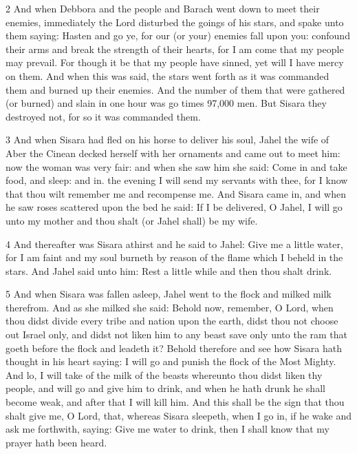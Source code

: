 \par 2 And when Debbora and the people and Barach went down to meet their enemies, immediately the Lord disturbed the goings of his stars, and spake unto them saying: Hasten and go ye, for our (or your) enemies fall upon you: confound their arms and break the strength of their hearts, for I am come that my people may prevail. For though it be that my people have sinned, yet will I have mercy on them. And when this was said, the stars went forth as it was commanded them and burned up their enemies. And the number of them that were gathered (or burned) and slain in one hour was go times 97,000 men. But Sisara they destroyed not, for so it was commanded them. 

\par 3 And when Sisara had fled on his horse to deliver his soul, Jahel the wife of Aber the Cinean decked herself with her ornaments and came out to meet him: now the woman was very fair: and when she saw him she said: Come in and take food, and sleep: and in. the evening I will send my servants with thee, for I know that thou wilt remember me and recompense me. And Sisara came in, and when he saw roses scattered upon the bed he said: If I be delivered, O Jahel, I will go unto my mother and thou shalt (or Jahel shall) be my wife. 

\par 4 And thereafter was Sisara athirst and he said to Jahel: Give me a little water, for I am faint and my soul burneth by reason of the flame which I beheld in the stars. And Jahel said unto him: Rest a little while and then thou shalt drink. 

\par 5 And when Sisara was fallen asleep, Jahel went to the flock and milked milk therefrom. And as she milked she said: Behold now, remember, O Lord, when thou didst divide every tribe and nation upon the earth, didst thou not choose out Israel only, and didst not liken him to any beast save only unto the ram that goeth before the flock and leadeth it? Behold therefore and see how Sisara hath thought in his heart saying: I will go and punish the flock of the Most Mighty. And lo, I will take of the milk of the beasts whereunto thou didst liken thy people, and will go and give him to drink, and when he hath drunk he shall become weak, and after that I will kill him. And this shall be the sign that thou shalt give me, O Lord, that, whereas Sisara sleepeth, when I go in, if he wake and ask me forthwith, saying: Give me water to drink, then I shall know that my prayer hath been heard.

